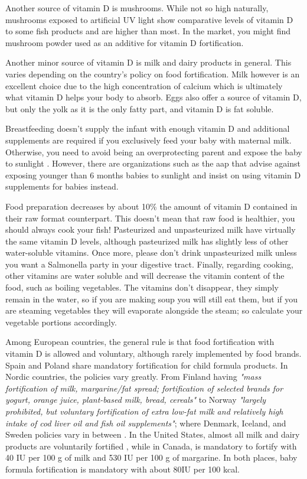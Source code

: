 Another source of vitamin D is mushrooms. While not so high naturally, mushrooms exposed to artificial UV light show comparative levels of vitamin D to some fish products and are higher than most. In the market, you might find mushroom powder used as an additive for vitamin D fortification.

Another minor source of vitamin D is milk and dairy products in general. This varies depending on the country's policy on food fortification. Milk however is an excellent choice due to the high concentration of calcium which is ultimately what vitamin D helps your body to absorb. Eggs also offer a source of vitamin D, but only the yolk as it is the only fatty part, and vitamin D is fat soluble.

Breastfeeding doesn't supply the infant with enough vitamin D and additional supplements are required if you exclusively feed your baby with maternal milk. Otherwise, you need to avoid being an overprotecting parent and expose the baby to sunlight \cite{ref:Meena2017-fs}. However, there are organizations such as the \gls{aap} that advise against exposing younger than 6 months babies to sunlight and insist on using vitamin D supplements for babies \cite{ref:Dawodu2012, ref:Davis2007} instead.

Food preparation decreases by about 10\% the amount of vitamin D contained in their raw format counterpart. This doesn't mean that raw food is healthier, you should always cook your fish! Pasteurized and unpasteurized milk have virtually the same vitamin D levels, although pasteurized milk has slightly less of other water-soluble vitamins. Once more, please don't drink unpasteurized milk unless you want a Salmonella party in your digestive tract. Finally, regarding cooking, other vitamins are water soluble and will decrease the vitamin content of the food, such as boiling vegetables. The vitamins don't disappear, they simply remain in the water, so if you are making soup you will still eat them, but if you are steaming vegetables they will evaporate alongside the steam; so calculate your vegetable portions accordingly.

Among European countries, the general rule is that food fortification with vitamin D is allowed and voluntary, although rarely implemented by food brands. Spain and Poland share mandatory fortification for child formula products. In Nordic countries, the policies vary greatly. From Finland having \textit{"mass fortification of milk, margarine/fat spread; fortification of selected brands for yogurt, orange juice, plant-based milk, bread, cereals"} to Norway \textit{"largely prohibited, but voluntary fortification of extra low-fat milk and relatively high intake of cod liver oil and fish oil supplements"}; where Denmark, Iceland, and Sweden policies vary in between \cite{ref:Niedermaier2022-rv}. In the United States, almost all milk and dairy products are voluntarily fortified \cite{ref:Yetley2008-wf}, while in Canada, is mandatory to fortify with 40 IU per 100 g of milk and 530 IU per 100 g of margarine. In both places, baby formula fortification is mandatory with about 80IU per 100 kcal.

